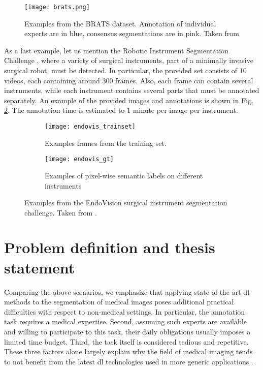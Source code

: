 \begin{figure}[!htpb]
  \texttt{[image: brats.png]}
  \caption{Examples from the BRATS dataset. Annotation of individual experts are in blue, consensus segmentations are in pink. Taken from \cite{menze15}}
  \label{fig:brats}
\end{figure}

As a last example, let us mention the Robotic Instrument Segmentation Challenge \cite{allan19}, where a variety of surgical instruments, part of a minimally invasive surgical robot, must be detected.
In particular, the provided set consists of $10$ videos, each containing around $300$ frames.
Also, each frame can contain several instruments, while each instrument contains several parts that must be annotated separately.
An example of the provided images and annotations is shown in Fig. \ref{fig:intro_endovis}.
The annotation time is estimated to $1$ minute per image per instrument.

\begin{figure}[t!]
    \centering
    \begin{subfigure}[b]{0.5\textwidth}
        \centering
        \texttt{[image: endovis\_trainset]}
        \caption{Examples frames from the training set.}
    \end{subfigure}%
    \begin{subfigure}[b]{0.5\textwidth}
        \centering
        \texttt{[image: endovis\_gt]}
        \caption{Examples of pixel-wise semantic labels on different instruments}
    \end{subfigure}
    \caption{Examples from the EndoVision surgical instrument segmentation challenge. Taken from \cite{allan19}.}
    \label{fig:intro_endovis}
\end{figure}

\section{Problem definition and thesis statement}

Comparing the above scenarios, we emphasize that applying state-of-the-art \gls{dl} methods to the segmentation of medical images poses additional practical difficulties with respect to non-medical settings.
In particular, the annotation task requires a medical expertise.
Second, assuming such experts are available and willing to participate to this task, their daily obligations usually imposes a limited time budget.
Third, the task itself is considered tedious and repetitive.
These three factors alone largely explain why the field of medical imaging tends to not benefit from the latest \gls{dl} technologies used in more generic applications \cite{orting19}.

